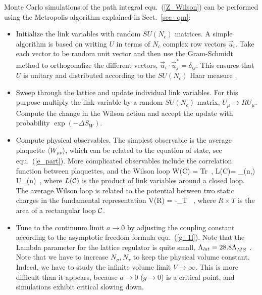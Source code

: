  Monte Carlo simulations of the path integral equ.~(\ref{Z_Wilson}) can 
be performed using the Metropolis algorithm  explained in 
Sect.~\ref{sec_qm}:

\begin{itemize}
\item Initialize the link variables with random
$SU(N_c)$ matrices. A simple algorithm is based on writing $U$
in terms of $N_c$ complex row vectors $\vec{u}_i$. Take each vector
to be random unit vector and then use the Gram-Schmidt method to 
orthogonalize the different vectors, $\vec{u}_i\cdot\vec{u}_j^*
=\delta_{ij}$. This ensures that $U$ is unitary and distributed
according to the $SU(N_c)$ Haar measure \cite{Mezzadri:2006}.

\item Sweep through the lattice and update individual link variables. 
For this purpose multiply the link variable by a random $SU(N_c)$
matrix, $U_\mu\to R U_\mu$. Compute the change in the Wilson action 
and accept the update with probability $\exp(-\Delta S_W)$. 

\item Compute physical observables. The simplest observable is the 
average plaquette $\langle W_{\mu\nu}\rangle$, which can be related
to the equation of state, see equ.~(\ref{e_part}). More complicated
observables include the correlation function between plaquettes, and 
the Wilson loop
\be 
W({\cal C}) = Tr \, , 
\hspace{0.5cm}
L({\cal C})= \prod_{(n,\mu)} U_\mu(n)\, , 
\ee
where $L({\cal C})$ is the product of link variables around a closed
loop. The average Wilson loop is related to the potential between
two static charges in the fundamental representation
\be 
 V(R) = -\lim_{T\to\infty} 
    \log {}\, ,
\ee
where $R\times T$ is the area of a rectangular loop ${\cal C}$. 

\item Tune to the continuum limit $a\to 0$ by adjusting the coupling 
constant according to the asymptotic freedom formula equ.~(\ref{g_1l}). 
Note that the Lambda parameter for the lattice regulator is quite small, 
$\Lambda_{\it lat} = 28.8 \Lambda_{\bar{MS}}$ \cite{Hasenfratz:1980kn}. Note 
that we have to increase $N_\sigma,N_\tau$ to keep the physical volume 
constant. Indeed, we have to study the infinite volume limit $V\to
\infty$. This is more difficult than it appears, because $a\to 0$ 
($g\to 0$) is a critical point, and simulations exhibit critical 
slowing down. 

\end{itemize}

